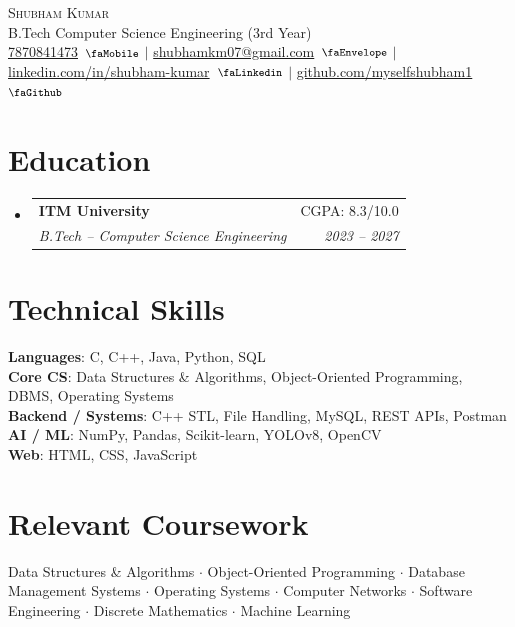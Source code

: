 \documentclass[a4paper,11pt]{extarticle}
\makeatletter
\newcommand{\resumeSubheading}[4]{
  \vspace{-2pt}\item
    \begin{tabular*}{0.97\textwidth}[t]{l@{\extracolsep{\fill}}r}
      \textbf{#1} & #2 \\
      \textit{\small #3} & \textit{\small #4} \\
    \end{tabular*}\vspace{-6pt}
}
\newcommand{\resumeSubHeadingListStart}{\begin{itemize}[leftmargin=0.15in, label={}]}
\newcommand{\resumeSubHeadingListEnd}{\end{itemize}}
\makeatother
\begin{document}
\begin{center}
    {\Huge \scshape Shubham Kumar} \\ \vspace{2pt}
    \small B.Tech Computer Science Engineering (3rd Year) \\ \vspace{2pt}
    \href{tel:+917870841473}{7870841473} \,$\vcenter{\hbox{\footnotesize\faMobile}}$
    $|$
    \href{mailto:shubhamkm07@gmail.com}{shubhamkm07@gmail.com} \,$\vcenter{\hbox{\footnotesize\faEnvelope}}$
    $|$
    \href{https://www.linkedin.com/in/shubham-kumar-05a9a5285}{linkedin.com/in/shubham-kumar} \,$\vcenter{\hbox{\footnotesize\faLinkedin}}$
    $|$
    \href{https://github.com/myselfshubham1}{github.com/myselfshubham1} \,$\vcenter{\hbox{\footnotesize\faGithub}}$
\end{center}

\section{Education}
  \resumeSubHeadingListStart
    \resumeSubheading
      {ITM University}{CGPA: 8.3/10.0}
      {B.Tech -- Computer Science Engineering}{2023 -- 2027}
  \resumeSubHeadingListEnd

\section{Technical Skills}
 \begin{itemize}[leftmargin=0.15in, label={}]
    \small{\item{
     \textbf{Languages}{: C, C++, Java, Python, SQL} \\
     \textbf{Core CS}{: Data Structures \& Algorithms, Object-Oriented Programming, DBMS, Operating Systems} \\
     \textbf{Backend / Systems}{: C++ STL, File Handling, MySQL, REST APIs, Postman} \\
     \textbf{AI / ML}{: NumPy, Pandas, Scikit-learn, YOLOv8, OpenCV} \\
     \textbf{Web}{: HTML, CSS, JavaScript}
    }}
 \end{itemize}

\section{Relevant Coursework}
 \begin{itemize}[leftmargin=0.15in, label={}]
    \small{\item{
      Data Structures \& Algorithms $\cdot$
      Object-Oriented Programming $\cdot$
      Database Management Systems $\cdot$
      Operating Systems $\cdot$
      Computer Networks $\cdot$
      Software Engineering $\cdot$
      Discrete Mathematics $\cdot$
      Machine Learning
    }}
 \end{itemize}
\end{document}

